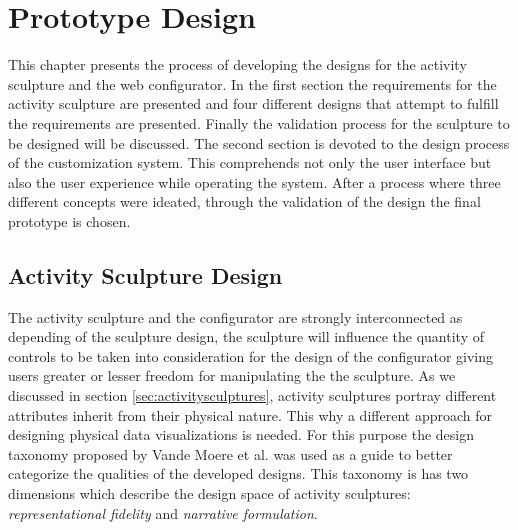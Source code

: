 \documentclass[../medieninformatik-arbeit.tex]{subfiles}
\begin{document}
\label{ch:proto}
\section{Prototype Design}
This chapter presents the process of developing the designs for the activity sculpture and the web configurator. In the first section the requirements for the activity sculpture are presented and four different designs that attempt to fulfill the requirements are presented. Finally the validation process for the sculpture to be designed will be discussed. The second section is devoted to the design process of the customization system. This comprehends not only the user interface but also the user experience while operating the system. After a process where three different concepts were ideated, through the validation of the design the final prototype is chosen. 

\subsection{Activity Sculpture Design}
The activity sculpture and the configurator are strongly interconnected as depending of the sculpture design, the sculpture will influence the quantity of controls to be taken into consideration for the design of the configurator giving users greater or lesser freedom for manipulating the the sculpture. As we discussed in section \ref{sec:activitysculptures}, activity sculptures portray different attributes inherit from their physical nature. This why a different approach for designing physical data visualizations is needed. For this purpose the design taxonomy proposed by Vande Moere et al.\cite{vande2009analyzing} was used as a guide to better categorize the qualities of the developed designs. This taxonomy is has two dimensions which describe the design space of activity sculptures: \textit{representational fidelity} and \textit{narrative formulation}. 
\end{document}
